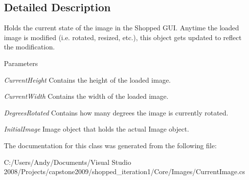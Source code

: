 \subsection{Detailed Description}
Holds the current state of the image in the Shopped GUI. Anytime the loaded image is modified (i.e. rotated, resized, etc.), this object gets updated to reflect the modification.


\begin{DoxyParams}{Parameters}
\item[{\em CurrentHeight}]Contains the height of the loaded image. \item[{\em CurrentWidth}]Contains the width of the loaded image. \item[{\em DegreesRotated}]Contains how many degrees the image is currently rotated. \item[{\em InitialImage}]Image object that holds the actual Image object. \end{DoxyParams}


The documentation for this class was generated from the following file:\begin{DoxyCompactItemize}
\item 
C:/Users/Andy/Documents/Visual Studio 2008/Projects/capstone2009/shopped\_\-iteration1/Core/Images/CurrentImage.cs\end{DoxyCompactItemize}
